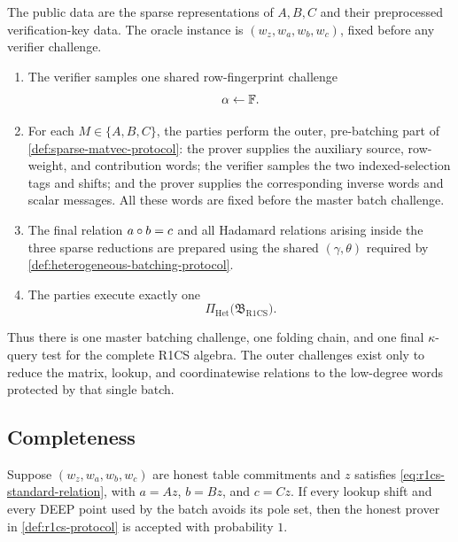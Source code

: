 \begin{definition}
\label{def:r1cs-protocol}
The public data are the sparse representations of $A,B,C$ and their preprocessed verification-key data.  The oracle instance is $(w_z,w_a,w_b,w_c)$, fixed before any verifier challenge.
\begin{enumerate}[label=\textnormal{\arabic*.},leftmargin=*]
  \item The verifier samples one shared row-fingerprint challenge
  \begin{equation}
    \alpha\leftarrow\mathbb{F}.
    \label{eq:r1cs-alpha}
  \end{equation}
  \item For each $M\in\{A,B,C\}$, the parties perform the outer, pre-batching part of \cref{def:sparse-matvec-protocol}: the prover supplies the auxiliary source, row-weight, and contribution words; the verifier samples the two indexed-selection tags and shifts; and the prover supplies the corresponding inverse words and scalar messages.  All these words are fixed before the master batch challenge.
  \item The final relation $a\circ b=c$ and all Hadamard relations arising inside the three sparse reductions are prepared using the shared $(\gamma,\theta)$ required by \cref{def:heterogeneous-batching-protocol}.
  \item The parties execute exactly one
  \begin{equation}
    \Pi_{\mathrm{Het}}\bigl(\mathfrak B_{\mathrm{R1CS}}\bigr).
    \label{eq:r1cs-one-heterogeneous-batch}
  \end{equation}
\end{enumerate}
\end{definition}

Thus there is one master batching challenge, one folding chain, and one final $\kappa$-query test for the complete R1CS algebra.  The outer challenges exist only to reduce the matrix, lookup, and coordinatewise relations to the low-degree words protected by that single batch.

\subsection{Completeness}
\label{sec:r1cs-completeness}

\begin{theorem}
\label{thm:r1cs-completeness}
Suppose $(w_z,w_a,w_b,w_c)$ are honest table commitments and $z$ satisfies \eqref{eq:r1cs-standard-relation}, with $a=Az$, $b=Bz$, and $c=Cz$.  If every lookup shift and every DEEP point used by the batch avoids its pole set, then the honest prover in \cref{def:r1cs-protocol} is accepted with probability $1$.
\end{theorem}

